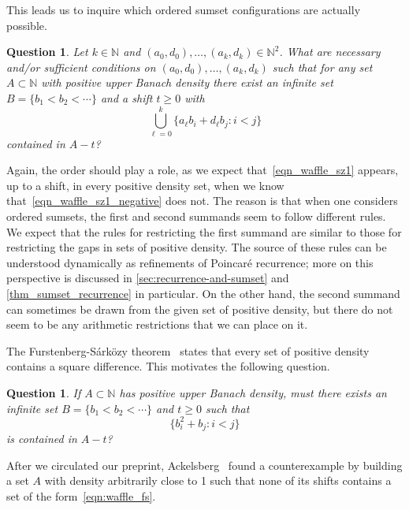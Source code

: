 \documentclass[10pt,dvipsnames]{article}
\newtheorem{question}[theorem]{Question}
\theoremstyle{definition}
\theoremstyle{plain}
\newcommand{\N}{\mathbb{N}}
\newcommand{\Poincare}{Poincar\'{e}}
\newcommand{\Sarkozy}{S\'{a}rk\"{o}zy}
\begin{document}
This leads us to inquire which ordered  sumset configurations are actually possible.



\begin{question}
\label{q:affine_images_of_sumsets}
Let $k\in\N$ and $(a_0,d_0),\ldots,(a_k,d_k) \in \N^2$.
What are necessary and/or sufficient conditions on $(a_0,d_0),\ldots,(a_k,d_k)$ such that for any set $A\subset\N$ with positive upper Banach density there exist an infinite set $B =\{b_1< b_2<\cdots\}$ and a shift $t\geq 0$ with
\[
\bigcup_{\ell=0}^k \{ a_\ell b_i + d_\ell b_j : i < j \}
\]
contained in $A-t$?
\end{question}




Again, the order should play a role, as 
 we expect that~\eqref{eqn_waffle_sz1} appears, up to a shift, in every positive density set, when we know that~\eqref{eqn_waffle_sz1_negative} does not.
The reason is that when one considers ordered sumsets, the  first and second summands seem to follow different rules. 
We expect that the rules for restricting the first summand are similar to those for restricting the gaps in sets of positive density.
The source of these rules can be understood dynamically as refinements of \Poincare{} recurrence;  more on this perspective is discussed in  \cref{sec:recurrence-and-sumset} and \cref{thm_sumset_recurrence} in particular.
On the other hand, the second summand can sometimes be drawn from the given set of positive density, but  
there do not seem to be any arithmetic restrictions that we can place on it.

The Furstenberg-\Sarkozy{} theorem~\cite{Furstenberg-1977,sarkozy78} states that every set of positive density contains a square difference.
This motivates the following question.



\begin{question}
\label{q_sumset_sarkozy}
If $A\subset\N$ has positive upper Banach density, must there exists an infinite set $B=\{b_1< b_2<\cdots\}$ and $t\geq 0$ such that 
\begin{equation}
\label{eqn:waffle_fs}
\{b_i^2+b_j: i<j\}
\end{equation}
is contained in $A-t$?
\end{question}

After we circulated our preprint, Ackelsberg~\cite{ackelsberg} found a counterexample by building a set $A$ with density arbitrarily close to 1 such that none of its shifts contains a set of the form~\eqref{eqn:waffle_fs}.  
\end{document}
